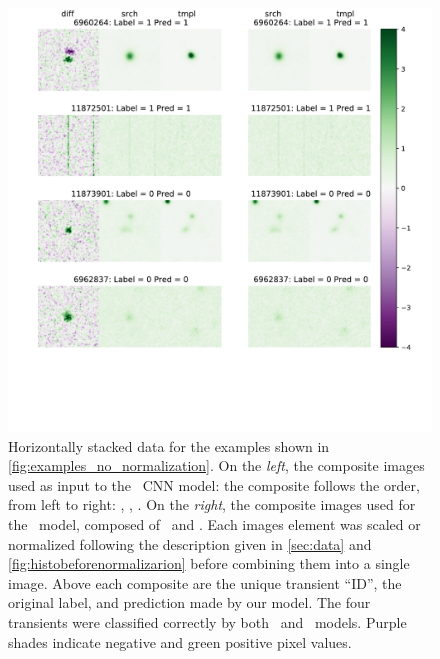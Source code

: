 \begin{figure}
    \centering
    \includegraphics[width=0.7\linewidth]{
    figures/32dex_new_test.pdf}
    \caption{Horizontally stacked data for the examples shown in \autoref{fig:examples_no_normalization}. On the {\it left}, the composite images used as input to the \diabased\ CNN model: the composite follows the order, from left to right: \diff, \search, \temp. On the {\it right}, the composite images used for the \nodia\ model, composed of \search\ and \temp. Each images element was scaled or normalized following the description given in \autoref{sec:data} and \autoref{fig:histobeforenormalizarion} before combining them into a single image. Above each composite are the unique transient ``ID'', the original label, and prediction made by our model. The four transients were classified correctly by both \diabased\ and \nodia\ models. Purple shades indicate negative and green  positive pixel values.
}
    \label{fig:examples_hstack_normalization}
\end{figure}
